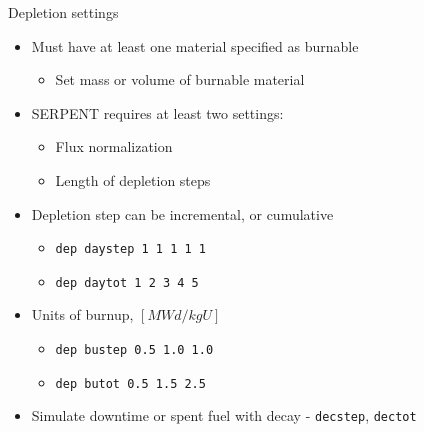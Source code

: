 \documentclass{beamer}
\begin{document}
\begin{frame}{Depletion settings}
    \begin{itemize}
        \item Must have at least one material specified as burnable
        \begin{itemize}
            \item Set mass or volume of burnable material
        \end{itemize}
        \item SERPENT requires at least two settings:
        \begin{itemize}
            \item Flux normalization
            \item Length of depletion steps
        \end{itemize}
        \item Depletion step can be incremental, or cumulative
        \begin{itemize}
            \item \texttt{dep daystep 1 1 1 1 1}
            \item \texttt{dep daytot 1 2 3 4 5}
        \end{itemize}
        \item Units of burnup, $[MWd/kgU]$
        \begin{itemize}
            \item{\texttt{dep bustep 0.5 1.0 1.0}}
            \item{\texttt{dep butot 0.5 1.5 2.5}}
        \end{itemize}
        \item{Simulate downtime or spent fuel with decay - \texttt{decstep}, \texttt{dectot}}
    \end{itemize}
\end{frame}
\end{document}
